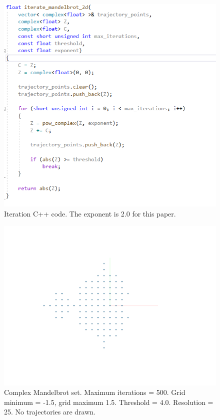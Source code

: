 \documentclass[12pt]{article}
\begin{document}
\begin{figure} 
\centering
  \includegraphics[width = 5 in]{code1.png}	
  \caption{Iteration C++ code.
The exponent is 2.0 for this paper.
}
\end{figure}

\begin{figure} 
\centering
  \includegraphics[width = 5 in]{set1.png}	
  \caption{Complex Mandelbrot set.
Maximum iterations = 500.
Grid minimum = -1.5, grid maximum 1.5.
Threshold = 4.0.
Resolution = 25.
No trajectories are drawn.
}
\end{figure}
\end{document}
